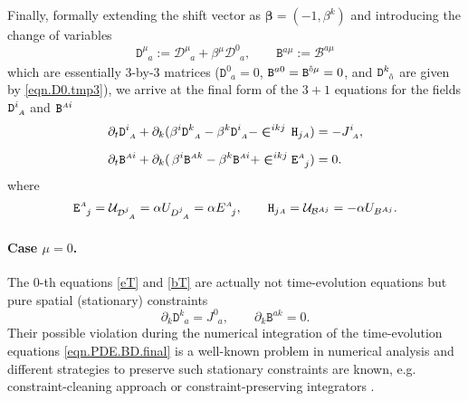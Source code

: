 \documentclass[
10pt, %
a4paper, %
oneside, %
headinclude,footinclude, %
BCOR5mm, %
]{scrartcl}
\newcommand{\sA}{\mathsmaller A}
\newcommand{\pd}[1]{\partial_{#1}}
\newcommand{\ET}[2]{E^{#1}_{\phantom{#1}#2}}	%
\newcommand{\Dm}[2]{D_{\phantom{#2}#1}^{#2}}	%
\newcommand{\aD}[2]{\mathcal{D}_{\phantom{#2}#1}^{#2}}	%
\newcommand{\Dfin}[2]{\mathtt{D}_{\phantom{#2}#1}^{#2}}	%
\newcommand{\Hfin}[2]{\mathtt{H}_{#2#1}}	%
\newcommand{\Efin}[2]{\mathtt{E}^{#1}_{\phantom{#1}#2}}	%
\newcommand{\Bm}[2]{B^{#1#2}}	%
\newcommand{\aB}[2]{\mathcal{B}^{#1#2}}	%
\newcommand{\Bfin}[2]{\mathtt{B}^{#1#2}}	%
\newcommand{\Um}{U}%
\newcommand{\aU}{\mathcal{U}}%
\newcommand{\LCsymb}{\bm{\in}}    %
\newcommand{\NC}[2]{J^{#2}_{\phantom{#2}#1}}
\newcommand{\indalg}[1]{\hat{\mathsmaller{#1}}}
\newcommand{\shift}[1]{\beta^{#1}}
\begin{document}
Finally, formally extending the shift vector as $ \bm{\beta}=(-1,\beta^{k}) $ and introducing the 
change of variables
\begin{equation}\label{eqn.varDB.final}
	\Dfin{a}{\mu} := \aD{a}{\mu} + \beta^{\mu} \aD{a}{0}, \qquad \Bfin{a}{\mu} := \aB{a}{\mu}
\end{equation}
which are essentially $ 3 $-by-$ 3 $ matrices ($ \Dfin{a}{0} = 0$, $ \Bfin{a}{0} = 
\Bfin{\indalg{0}}{\mu} = 0 $, and $ \Dfin{\indalg{0}}{k} $ are given by \eqref{eqn.D0.tmp3}),
we arrive at the final form of the $ 3+1 $ equations for the fields $ \Dfin{\sA}{i} $ and $ 
\Bfin{\sA}{i} $
\begin{subequations}\label{eqn.PDE.BD.final}
	\begin{align}
		\pd{t} \Dfin{\sA}{i} + \pd{k}(\shift{i} 
		\Dfin{\sA}{k} - \shift{k}\Dfin{\sA}{i}  - \LCsymb^{ikj} \,
		\Hfin{\sA}{j}) & 
		= -\NC{\sA}{i}, \label{eqn.tpo.D}\\[2mm]
		\pd{t} \Bfin{\sA}{i} + \pd{k}(\,\shift{i} 
		\Bfin{\sA}{k} - \shift{k}\Bfin{\sA}{i}  + \LCsymb^{ikj} 
		\Efin{\sA}{j}) & 
		= 0\label{eqn.tpo.B} .
	\end{align}
\end{subequations}
where
\begin{equation}\label{eqn.HE.fin}
	\Efin{\sA}{j} = \aU_{\aD{\sA}{j}} = \alpha \Um_{\Dm{\sA}{j}}= \alpha \ET{\sA}{j},
	\qquad
	\Hfin{\sA}{j} = \aU_{\aB{\sA}{j}} =-\alpha \Um_{\Bm{\sA}{j}}.
\end{equation}




\paragraph{Case $ \mu = 0 $.} 

The $ 0 $-th equations \eqref{eT} and \eqref{bT} are actually not time-evolution equations but  
pure spatial (stationary) constraints
\begin{equation}\label{eqn.div.constr}
	\pd{k} \Dfin{a}{k} = \NC{a}{0}, 
	\qquad
	\pd{k} \Bfin{a}{k} = 0.
\end{equation}
Their possible violation during the numerical integration of the time-evolution equations 
\eqref{eqn.PDE.BD.final} is a well-known problem in numerical analysis and different strategies to 
preserve such stationary constraints   
are known, e.g. constraint-cleaning approach \cite{Munz2000,Dedneretal,Dumbser2019} or 
constraint-preserving 
integrators 
\cite{Olivares2022,SIGPR2021}.
\end{document}

